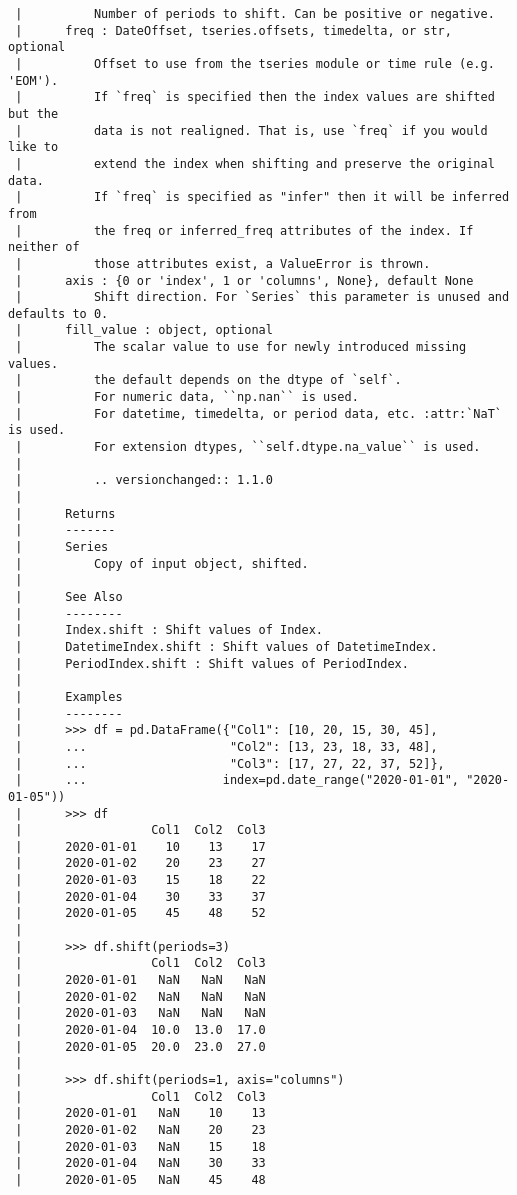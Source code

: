 \documentclass[
  letterpaper,
  DIV=11,
  numbers=noendperiod]{scrreprt}
\begin{document}
\begin{verbatim}
 |          Number of periods to shift. Can be positive or negative.
 |      freq : DateOffset, tseries.offsets, timedelta, or str, optional
 |          Offset to use from the tseries module or time rule (e.g. 'EOM').
 |          If `freq` is specified then the index values are shifted but the
 |          data is not realigned. That is, use `freq` if you would like to
 |          extend the index when shifting and preserve the original data.
 |          If `freq` is specified as "infer" then it will be inferred from
 |          the freq or inferred_freq attributes of the index. If neither of
 |          those attributes exist, a ValueError is thrown.
 |      axis : {0 or 'index', 1 or 'columns', None}, default None
 |          Shift direction. For `Series` this parameter is unused and defaults to 0.
 |      fill_value : object, optional
 |          The scalar value to use for newly introduced missing values.
 |          the default depends on the dtype of `self`.
 |          For numeric data, ``np.nan`` is used.
 |          For datetime, timedelta, or period data, etc. :attr:`NaT` is used.
 |          For extension dtypes, ``self.dtype.na_value`` is used.
 |      
 |          .. versionchanged:: 1.1.0
 |      
 |      Returns
 |      -------
 |      Series
 |          Copy of input object, shifted.
 |      
 |      See Also
 |      --------
 |      Index.shift : Shift values of Index.
 |      DatetimeIndex.shift : Shift values of DatetimeIndex.
 |      PeriodIndex.shift : Shift values of PeriodIndex.
 |      
 |      Examples
 |      --------
 |      >>> df = pd.DataFrame({"Col1": [10, 20, 15, 30, 45],
 |      ...                    "Col2": [13, 23, 18, 33, 48],
 |      ...                    "Col3": [17, 27, 22, 37, 52]},
 |      ...                   index=pd.date_range("2020-01-01", "2020-01-05"))
 |      >>> df
 |                  Col1  Col2  Col3
 |      2020-01-01    10    13    17
 |      2020-01-02    20    23    27
 |      2020-01-03    15    18    22
 |      2020-01-04    30    33    37
 |      2020-01-05    45    48    52
 |      
 |      >>> df.shift(periods=3)
 |                  Col1  Col2  Col3
 |      2020-01-01   NaN   NaN   NaN
 |      2020-01-02   NaN   NaN   NaN
 |      2020-01-03   NaN   NaN   NaN
 |      2020-01-04  10.0  13.0  17.0
 |      2020-01-05  20.0  23.0  27.0
 |      
 |      >>> df.shift(periods=1, axis="columns")
 |                  Col1  Col2  Col3
 |      2020-01-01   NaN    10    13
 |      2020-01-02   NaN    20    23
 |      2020-01-03   NaN    15    18
 |      2020-01-04   NaN    30    33
 |      2020-01-05   NaN    45    48

\end{verbatim}
\end{document}
